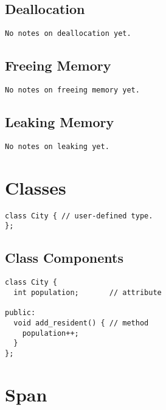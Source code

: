 \subsection{Deallocation}

\begin{verbatim}
No notes on deallocation yet.
\end{verbatim}

\subsection{Freeing Memory}

\begin{verbatim}
No notes on freeing memory yet.
\end{verbatim}

\subsection{Leaking Memory}
\begin{verbatim}
No notes on leaking yet.
\end{verbatim}

\section{Classes}

\begin{verbatim}
class City { // user-defined type.
};
\end{verbatim}

\subsection{Class Components}

\begin{verbatim}
class City {
  int population;       // attribute
 
public:
  void add_resident() { // method
    population++;
  }
};
\end{verbatim}

\section{Span}

